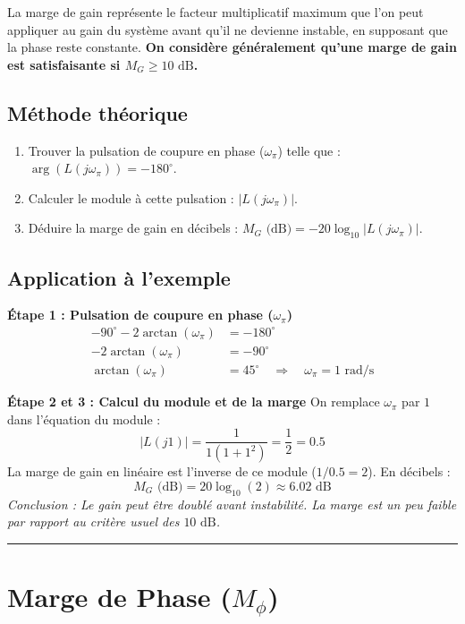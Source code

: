 \documentclass[12pt, a4paper]{article}
\begin{document}
La marge de gain représente le facteur multiplicatif maximum que l'on peut appliquer au gain du système avant qu'il ne devienne instable, en supposant que la phase reste constante. \textbf{On considère généralement qu'une marge de gain est satisfaisante si $M_G \geq 10 \text{ dB}$.}

\subsection{Méthode théorique}
\begin{enumerate}
    \item Trouver la pulsation de coupure en phase ($\omega_\pi$) telle que : $\arg(L(j\omega_\pi)) = -180^\circ$.
    \item Calculer le module à cette pulsation : $|L(j\omega_\pi)|$.
    \item Déduire la marge de gain en décibels : $M_G \text{ (dB)} = -20 \log_{10} |L(j\omega_\pi)|$.
\end{enumerate}

\subsection{Application à l'exemple}
\textbf{Étape 1 : Pulsation de coupure en phase ($\omega_\pi$)}
\begin{align*}
    -90^\circ - 2\arctan(\omega_\pi) &= -180^\circ \\
    -2\arctan(\omega_\pi) &= -90^\circ \\
    \arctan(\omega_\pi) &= 45^\circ \quad \Longrightarrow \quad \omega_\pi = 1 \text{ rad/s}
\end{align*}

\textbf{Étape 2 et 3 : Calcul du module et de la marge}
On remplace $\omega_\pi$ par $1$ dans l'équation du module :
\begin{equation*}
    |L(j1)| = \frac{1}{1(1+1^2)} = \frac{1}{2} = 0.5
\end{equation*}
La marge de gain en linéaire est l'inverse de ce module ($1/0.5 = 2$). En décibels :
\begin{equation*}
    M_G \text{ (dB)} = 20 \log_{10}(2) \approx 6.02 \text{ dB}
\end{equation*}
\textit{Conclusion : Le gain peut être doublé avant instabilité. La marge est un peu faible par rapport au critère usuel des $10 \text{ dB}$.}

\rule{\linewidth}{0.5pt}

\section{Marge de Phase ($M_\phi$)}
\end{document}
